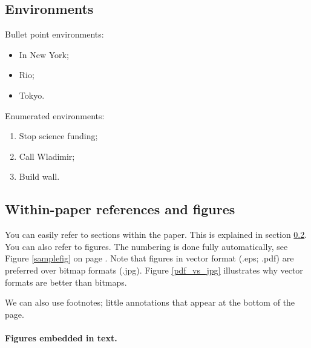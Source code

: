 
\subsection{Environments}

Bullet point environments:
\begin{itemize}
\item In New York;
\item Rio;
\item Tokyo.
\end{itemize}

Enumerated environments:
\begin{enumerate}
\item Stop science funding;
\item Call Wladimir;
\item Build wall.
\end{enumerate}

\subsection{Within-paper references and figures}
\label{withpaperrefs}

You can easily refer to sections within the paper. This is explained in section \ref{withpaperrefs}. You can also refer to figures. The numbering is done fully automatically, see Figure \ref{samplefig} on page \pageref{samplefig}. Note that figures in vector format (.eps; .pdf) are preferred over bitmap formats (.jpg). Figure \ref{pdf_vs_jpg} illustrates why vector formats are better than bitmaps.

We can also use footnotes; little annotations that appear at the bottom of the page\footnotemark.


\newpage

\paragraph{Figures embedded in text.}

